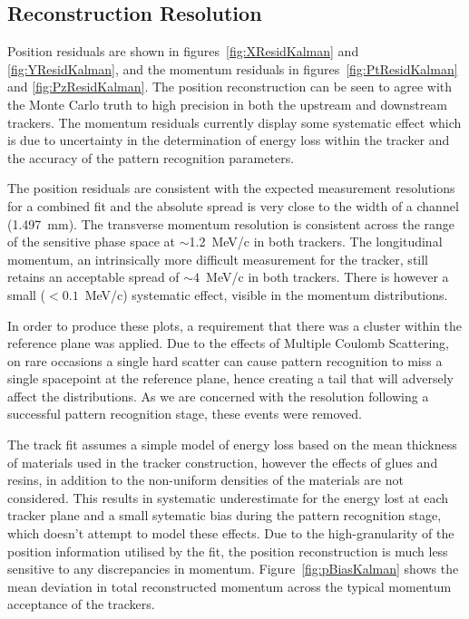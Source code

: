   \subsection{Reconstruction Resolution}
  \label{sec:performance:resolutions}
  
  Position residuals are shown in figures~\ref{fig:XResidKalman} and \ref{fig:YResidKalman}, and the momentum residuals in figures~\ref{fig:PtResidKalman} and \ref{fig:PzResidKalman}.  The position reconstruction can be seen to agree with the Monte Carlo truth to high precision in both the upstream and downstream trackers. The momentum residuals currently display some systematic effect which is due to uncertainty in the determination of energy loss within the tracker and the accuracy of the pattern recognition parameters.

  The position residuals are consistent with the expected measurement resolutions for a combined fit and the absolute spread is very close to the width of a channel (1.497~mm). The transverse momentum resolution is consistent across the range of the sensitive phase space at $\sim$1.2~MeV/c in both trackers. The longitudinal momentum, an intrinsically more difficult measurement for the tracker, still retains an acceptable spread of ${\sim4}$~MeV/c in both trackers. There is however a small ($<0.1$~MeV/c) systematic effect, visible in the momentum distributions.

  In order to produce these plots, a requirement that there was a cluster within the reference plane was applied. Due to the effects of Multiple Coulomb Scattering, on rare occasions a single hard scatter can cause pattern recognition to miss a single spacepoint at the reference plane, hence creating a tail that will adversely affect the distributions. As we are concerned with the resolution following a successful pattern recognition stage, these events were removed.
  
  
  The track fit assumes a simple model of energy loss based on the mean thickness of materials used in the tracker construction, however the effects of glues and resins, in addition to the non-uniform densities of the materials are not considered. This results in systematic underestimate for the energy lost at each tracker plane and a small sytematic bias during the pattern recognition stage, which doesn't attempt to model these effects. Due to the high-granularity of the position information utilised by the fit, the position reconstruction is much less sensitive to any discrepancies in momentum. Figure~\ref{fig:pBiasKalman} shows the mean deviation in total reconstructed momentum across the typical momentum acceptance of the trackers.

